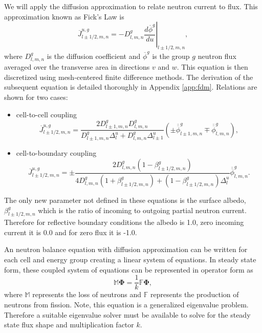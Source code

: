 \documentclass{ansconf}
\numberwithin{equation}{section}
\begin{document}
 We will apply the diffusion approximation to relate neutron current to flux. This approximation known as Fick's Law is
 \begin{equation}
     \overline{J}^{u,g}_{l\pm1/2,m,n} = -D_{l,m,n}^g\left.\frac{d\overline{\phi}^g}{du}\right|_{l\pm 1/2,m,n},
 \end{equation}
where $D_{l,m,n}^g$ is the diffusion coefficient and $\overline{\phi}^g$ is the group $g$ neutron flux averaged over the transverse area in directions $v$ and $w$. This equation is then discretized using mesh-centered finite difference methods. The derivation of the subsequent equation is detailed thoroughly in Appendix \ref{app:fdm}. Relations are shown for two cases:
\begin{itemize}
	\item cell-to-cell coupling
	\begin{equation}
	    \overline{J}^{u,g}_{l\pm1/2,m,n} = \frac{2D_{l\pm1,m,n}^gD_{l,m,n}^g}{D_{l\pm1,m,n}^g\Delta_l^u + D_{l,m,n}^g\Delta_{l\pm1}^u}\left(\pm\overline{\overline{\phi}}_{l\pm1,m,n}^g\mp \overline{\overline{\phi}}_{l,m,n}^g\right),
	\end{equation}
	\item cell-to-boundary coupling
	\begin{equation}
	    \overline{J}^{u,g}_{l\pm1/2,m,n} = \pm\frac{2D_{l,m,n}^g\left(1 - \beta_{l\pm1/2,m,n}^g\right)}{4D_{l,m,n}^g\left(1 + \beta_{l\pm1/2,m,n}^g\right) + \left(1 - \beta_{l\pm1/2,m,n}^g\right)\Delta_l^u}\overline{\overline{\phi}}_{l,m,n}^g.
	\end{equation}
\end{itemize}
The only new parameter not defined in these equations is the surface albedo, $\beta_{l\pm1/2,m,n}^g$ which is the ratio of incoming to outgoing partial neutron current. Therefore for reflective boundary conditions the albedo is 1.0, zero incoming current it is 0.0 and for zero flux it is -1.0.

An neutron balance equation with diffusion approximation can be written for each cell and energy group creating a linear system of equations. In steady state form, these coupled system of equations can be represented in operator form as
\begin{equation}\label{eq:steady_oper}
    \mathbb{M}\boldsymbol{\Phi} = \frac{1}{k}\mathbb{F}\boldsymbol{\Phi},
\end{equation}
where $\mathbb{M}$ represents the loss of neutrons and $\mathbb{F}$ represents the production of neutrons from fission. Note, this equation is a generalized eigenvalue problem. Therefore a suitable eigenvalue solver must be available to solve for the steady state flux shape and multiplication factor $k$.
\end{document}
